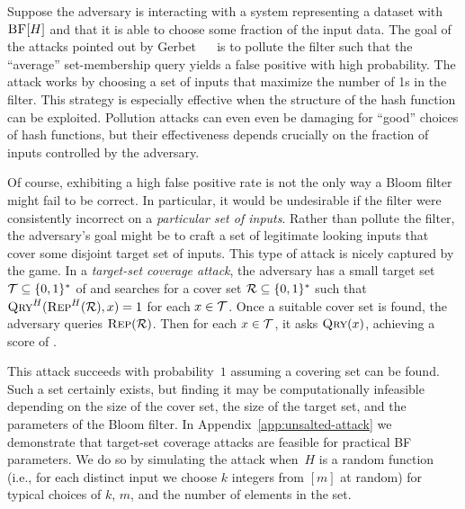 %
Suppose the adversary is interacting with a system representing a dataset with
$\textsc{BF}[H]$ and that it is able to choose some fraction of the input data.
%
%
The goal of the attacks pointed out by Gerbet \etal~~\cite{gerbet2015power} is
to pollute the filter such that the ``average'' set-membership query yields a
false positive with high probability. The attack works by choosing a set of
inputs that maximize the number of 1s in the filter. This strategy is especially
effective when the structure of the hash function can be exploited.
%
%
Pollution attacks can even even be damaging for ``good'' choices of hash
functions, but their effectiveness depends crucially on the fraction of inputs
controlled by the adversary.
%

%
Of course, exhibiting a high false positive rate is not the only way a Bloom
filter might fail to be correct. In particular, it would be undesirable if the
filter were consistently incorrect on a \emph{particular set of inputs}. Rather
than pollute the filter, the adversary's goal might be to craft a set of
legitimate looking inputs that cover some disjoint target set of inputs.
%
This type of attack is nicely captured by the  game.
%
In a \emph{target-set coverage attack}, the adversary has a small target set
$\mathcal{T}\subseteq\{0,1\}^*$ of and searches for a cover set $\mathcal{R}\subseteq\{0,1\}^*$
such that $\textsc{Qry}^H(\textsc{Rep}^H(\mathcal{R}),x)=1$ for each $x\in\mathcal{T}$.
%
Once a suitable cover set is found, the adversary queries $\textsc{Rep}(\mathcal{R})$. Then
for each $x\in\mathcal{T}$, it asks $\textsc{Qry}(x)$, achieving a score of .

This attack succeeds with probability~$1$ assuming a covering set can be found.
Such a set certainly exists, but finding it may be computationally infeasible
depending on the size of the cover set, the size of the target set, and the
parameters of the Bloom filter.
%
In Appendix~\ref{app:unsalted-attack} we demonstrate that target-set coverage
attacks are feasible for practical BF parameters. We do so by simulating the
attack when~$H$ is a random function (i.e., for each distinct input we choose
$k$ integers from $[m]$ at random) for typical choices of $k$, $m$, and the
number of elements in the set.
%

